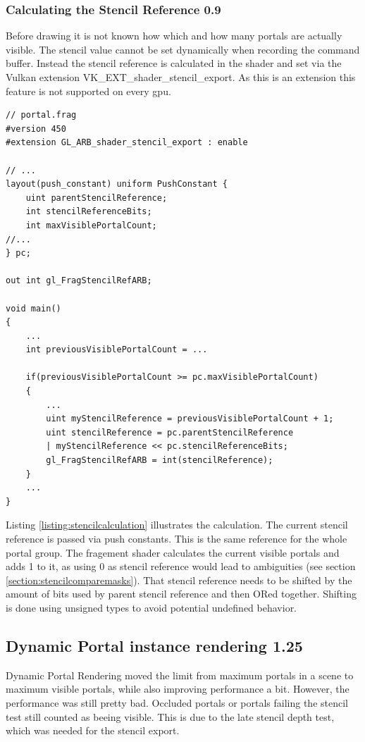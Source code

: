 \subsubsection{Calculating the Stencil Reference 0.9}
Before drawing it is not known how which and how many portals are actually visible. The stencil value cannot be set dynamically when recording the command buffer. Instead the stencil reference is calculated in the shader and set via the Vulkan extension VK\_EXT\_shader\_stencil\_export. As this is an extension this feature is not supported on every \gls{gpu}.

\begin{lstlisting}[caption={Calculate Stencil Reference in Shader}, label=listing:stencilcalculation]
// portal.frag
#version 450
#extension GL_ARB_shader_stencil_export : enable

// ...
layout(push_constant) uniform PushConstant {	
	uint parentStencilReference;
	int stencilReferenceBits;
	int maxVisiblePortalCount;
//...
} pc;

out int gl_FragStencilRefARB;

void main()
{
	...
	int previousVisiblePortalCount = ...
	
	if(previousVisiblePortalCount >= pc.maxVisiblePortalCount)
	{
		...
		uint myStencilReference = previousVisiblePortalCount + 1;
		uint stencilReference = pc.parentStencilReference 
		| myStencilReference << pc.stencilReferenceBits;
		gl_FragStencilRefARB = int(stencilReference);
	}	
	...
}
\end{lstlisting}

Listing \ref{listing:stencilcalculation} illustrates the calculation. The current stencil reference is passed via push constants. This is the same reference for the whole portal group. The fragement shader calculates the current visible portals and adds 1 to it, as using 0 as stencil reference would lead to ambiguities (see section \ref{section:stencilcomparemasks}). That stencil reference needs to be shifted by the amount of bits used by parent stencil reference and then ORed together. Shifting is done using unsigned types to avoid potential undefined behavior.

\subsection{Dynamic Portal instance rendering 1.25}
\label{section:dynamicportalinstancerendering}
Dynamic Portal Rendering moved the limit from maximum portals in a scene to maximum visible portals, while also improving performance a bit. However, the performance was still pretty bad. Occluded portals or portals failing the stencil test still counted as beeing visible. This is due to the late stencil depth test, which was needed for the stencil export.

